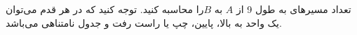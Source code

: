 \p
تعداد مسیر‌های به طول 9 از $A$ به $B$را محاسبه کنید.
توجه کنید که در هر قدم می‌توان یک واحد به بالا، پایین، چپ یا راست رفت و جدول نامتناهی می‌باشد.

\p
{}